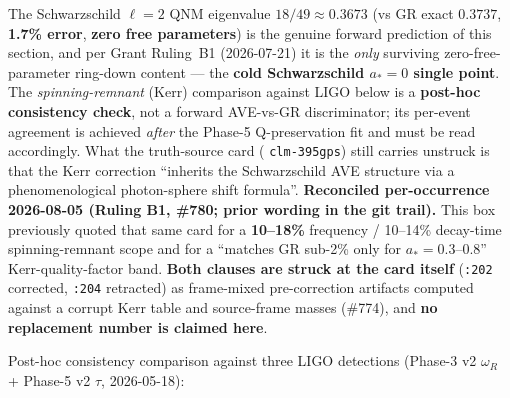 \begin{tcolorbox}[colback=white, colframe=black, title=\textbf{Scope: post-hoc consistency check, not a forward discriminator}]
The Schwarzschild $\ell=2$ QNM eigenvalue $18/49 \approx 0.3673$ (vs GR exact $0.3737$, \textbf{1.7\% error}, \textbf{zero free parameters}) is the genuine forward prediction of this section, and per Grant Ruling~B1 (2026-07-21) it is the \emph{only} surviving zero-free-parameter ring-down content --- the \textbf{cold Schwarzschild $a_* = 0$ single point}. The \emph{spinning-remnant} (Kerr) comparison against LIGO below is a \textbf{post-hoc consistency check}, not a forward AVE-vs-GR discriminator; its per-event agreement is achieved \emph{after} the Phase-5 Q-preservation fit and must be read accordingly. What the truth-source card ( \texttt{clm-395gps}) still carries unstruck is that the Kerr correction ``inherits the Schwarzschild AVE structure via a phenomenological photon-sphere shift formula''. \textbf{Reconciled per-occurrence 2026-08-05 (Ruling B1, \#780; prior wording in the git trail).} This box previously quoted that same card for a \textbf{10--18\%} frequency / 10--14\% decay-time spinning-remnant scope and for a ``matches GR sub-2\% only for $a_* = 0.3$--$0.8$'' Kerr-quality-factor band. \textbf{Both clauses are struck at the card itself} (\texttt{:202} corrected, \texttt{:204} retracted) as frame-mixed pre-correction artifacts computed against a corrupt Kerr table and source-frame masses (\#774), and \textbf{no replacement number is claimed here}.
\end{tcolorbox}

\medskip\noindent
Post-hoc consistency comparison against three LIGO detections (Phase-3 v2 $\omega_R$ + Phase-5 v2 $\tau$, 2026-05-18):

